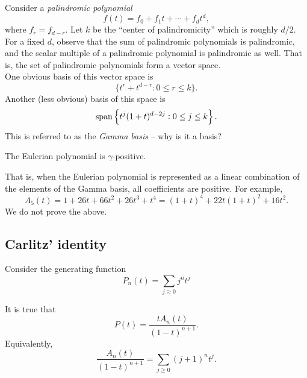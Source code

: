 	Consider a \emph{palindromic polynomial}
	\[ f(t) = f_0 + f_1 t + \cdots + f_dt^d, \]
	where $f_r = f_{d-r}$. Let $k$ be the ``center of palindromicity'' which is roughly $d/2$. For a fixed $d$, observe that the sum of palindromic polynomials is palindromic, and the scalar multiple of a palindromic polynomial is palindromic as well. That is, the set of palindromic polynomials form a vector space.\\
	One obvious basis of this vector space is
	\[ \{ t^r + t^{d-r} : 0 \le r \le k \}. \]
	Another (less obvious) basis of this space is
	\[ \operatorname{span}\left\{ t^j (1+t)^{d-2j} : 0 \le j \le k \right\}. \]
	This is referred to as the \emph{Gamma basis} -- why is it a basis?

	\begin{ftheo}
		The Eulerian polynomial is $\gamma$-positive.
	\end{ftheo}
	That is, when the Eulerian polynomial is represented as a linear combination of the elements of the Gamma basis, all coefficients are positive. For example,
	\[ A_5(t) = 1+26t+66t^2+26t^3+t^4 = (1+t)^4 + 22t(1+t)^2 + 16t^2. \]
	We do not prove the above.

\subsection{Carlitz' identity}

	Consider the generating function
	\[ P_n(t) = \sum_{j \ge 0} j^n t^j \]

	\begin{ftheo}
		\label{theo: carlitz identity}
		It is true that
		\[ P(t) = \frac{tA_n(t)}{(1-t)^{n+1}}. \]
		Equivalently,
		\[ \frac{A_n(t)}{(1-t)^{n+1}} = \sum_{j \ge 0} (j+1)^n t^j. \]
	\end{ftheo}

